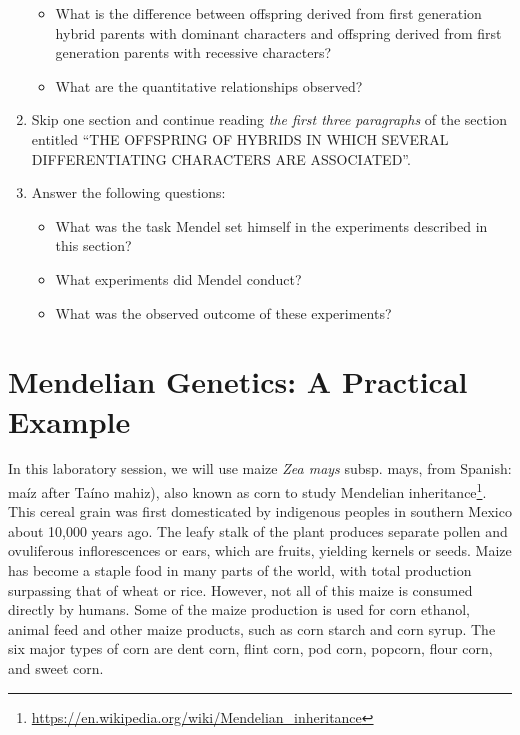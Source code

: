 \documentclass[]{book}
\providecommand{\tightlist}{%
  \setlength{\itemsep}{0pt}\setlength{\parskip}{0pt}}
\let\rmarkdownfootnote\footnote%
\def\footnote{\protect\rmarkdownfootnote}
\renewcommand{\href}[2]{#2\footnote{\url{#1}}}
\begin{document}
\begin{enumerate}
  \begin{itemize}
  \tightlist
  \item
    What is the difference between offspring derived from first
    generation hybrid parents with dominant characters and offspring
    derived from first generation parents with recessive characters?
  \item
    What are the quantitative relationships observed?
  \end{itemize}
\item
  Skip one section and continue reading \emph{the first three
  paragraphs} of the section entitled ``THE OFFSPRING OF HYBRIDS IN
  WHICH SEVERAL DIFFERENTIATING CHARACTERS ARE ASSOCIATED''.
\item
  Answer the following questions:

  \begin{itemize}
  \tightlist
  \item
    What was the task Mendel set himself in the experiments described in
    this section?
  \item
    What experiments did Mendel conduct?\\
  \item
    What was the observed outcome of these experiments?
  \end{itemize}
\end{enumerate}

\chapter{Mendelian Genetics: A Practical
Example}\label{mendelian-genetics-a-practical-example}

In this laboratory session, we will use maize \emph{Zea mays} subsp.
mays, from Spanish: maíz after Taíno mahiz), also known as corn to study
\href{https://en.wikipedia.org/wiki/Mendelian_inheritance}{Mendelian
inheritance}. This cereal grain was first domesticated by indigenous
peoples in southern Mexico about 10,000 years ago. The leafy stalk of
the plant produces separate pollen and ovuliferous inflorescences or
ears, which are fruits, yielding kernels or seeds. Maize has become a
staple food in many parts of the world, with total production surpassing
that of wheat or rice. However, not all of this maize is consumed
directly by humans. Some of the maize production is used for corn
ethanol, animal feed and other maize products, such as corn starch and
corn syrup. The six major types of corn are dent corn, flint corn, pod
corn, popcorn, flour corn, and sweet corn.
\end{document}
